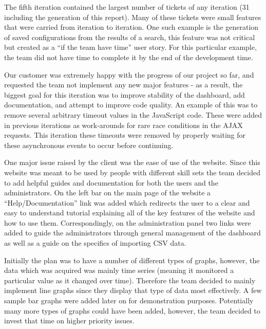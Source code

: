 \documentclass{l3proj}
\begin{document}
The fifth iteration contained the largest number of tickets of any iteration (31 including the generation of this report). Many of these tickets were small features that were carried from iteration to iteration. One such example is the generation of saved configurations from the results of a search, this feature was not critical but created as a ``if the team have time'' user story. For this particular example, the team did not have time to complete it by the end of the development time.

Our customer was extremely happy with the progress of our project so far, and requested the team not implement any new major features - as a result, the biggest goal for this iteration was to improve stability of the dashboard, add documentation, and attempt to improve code quality. An example of this was to remove several arbitrary timeout values in the JavaScript code. These were added in previous iterations as work-arounds for rare race conditions in the AJAX requests. This iteration these timeouts were removed by properly waiting for these asynchronous events to occur before continuing.

One major issue raised by the client was the ease of use of the website. Since this website was meant to be used by people with different skill sets the team decided to add helpful guides and documentation for both the users and the administrators. On the left bar on the main page of the website a ``Help/Documentation'' link was added which redirects the user to a clear and easy to understand tutorial explaining all of the key features of the website and how to use them. Correspondingly, on the administration panel two links were added to guide the administrators through general management of the dashboard as well as a guide on the specifics of importing CSV data.

Initially the plan was to have a number of different types of graphs, however, the data which was acquired was mainly time series (meaning it monitored a particular value as it changed over time). Therefore the team decided to mainly implement line graphs since they display that type of data most effectively. A few sample bar graphs were added later on for demonstration purposes. Potentially many more types of graphs could have been added, however, the team decided to invest that time on higher priority issues.
\end{document}
